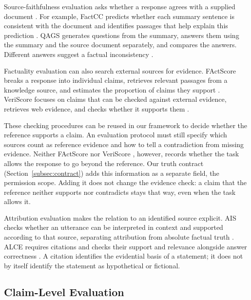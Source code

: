 \documentclass{clv2025}
\begin{document}
Source-faithfulness evaluation asks whether a response agrees with a supplied
document \citep{maynez_faithfulness_2020}. For example, FactCC predicts whether
each summary sentence is consistent with the document and identifies
passages that help explain this prediction \citep{kryscinski_evaluating_2020}.
QAGS generates questions from the summary, answers them using the summary
and the source document separately, and compares the answers. Different
answers suggest a factual inconsistency \citep{wang_asking_2020}.

Factuality evaluation can also search external sources for evidence.
FActScore breaks a response into individual claims, retrieves relevant
passages from a knowledge source, and estimates the proportion of claims
they support \citep{min_factscore_2023}. VeriScore focuses on claims that
can be checked against external evidence, retrieves web evidence, and
checks whether it supports them \citep{song_veriscore_2024}.

These checking procedures can be reused in our framework to decide whether
the reference supports a claim. An evaluation protocol must still specify
which sources count as reference evidence and how to tell a contradiction
from missing evidence. Neither FActScore nor VeriScore \citep{min_factscore_2023,song_veriscore_2024}, however, records
whether the task allows the response to go beyond the reference. Our truth
contract (Section~\ref{subsec:contract}) adds this information as a
separate field, the permission scope. Adding it does not change the
evidence check: a claim that the reference neither supports nor
contradicts stays that way, even when the task allows it.

Attribution evaluation makes the relation to an identified source explicit.
AIS checks whether an utterance can be interpreted in context and supported
according to that source, separating attribution from absolute factual truth
\citep{rashkin_ais_2023}. ALCE requires citations and checks their support
and relevance alongside answer correctness \citep{gao_alce_2023}.
A citation identifies the evidential basis of a statement; it does not by
itself identify the statement as hypothetical or fictional.

\subsection{Claim-Level Evaluation}\label{subsec:extraction}
\end{document}
